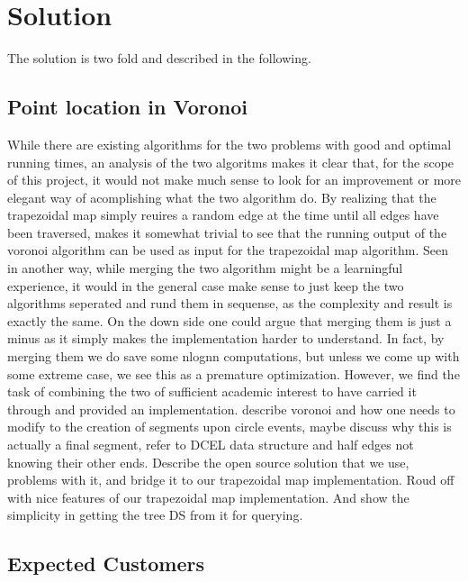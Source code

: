 \section{Solution}

The solution is two fold and described in the following.

\subsection{Point location in Voronoi}
While there are existing algorithms for the two problems with good and optimal running times, an analysis of the two algoritms makes
it clear that, for the scope of this project, it would not make much sense to look for an improvement or more elegant way of acomplishing what
the two algorithm do. By realizing that the trapezoidal map simply reuires a random edge at the time until all edges have been traversed, makes it somewhat trivial to see that the running output of the voronoi algorithm can be used as input for the trapezoidal map algorithm. Seen in another way, while merging the two algorithm might be a learningful experience, it would in the general case make sense to just keep the two algorithms seperated and rund them in sequense, as the complexity and result is exactly the same. On the down side one could argue that merging them is just a minus as it simply makes the implementation harder to understand. In fact, by merging them we do save some nlognn computations, but unless we come up with some extreme case, we see this as a premature optimization. However, we find the task of combining the two of sufficient academic interest to have carried it through and provided an implementation. describe voronoi and how one needs to modify to the creation of segments upon circle events, maybe discuss why this is actually a final segment, refer to DCEL data structure and half edges not knowing their other ends. Describe the open source solution that we use, problems with it, and bridge it to our trapezoidal map implementation. Roud off with nice features of our trapezoidal map implementation. And show the simplicity in getting the tree DS from it for querying.

\subsection{Expected Customers}

